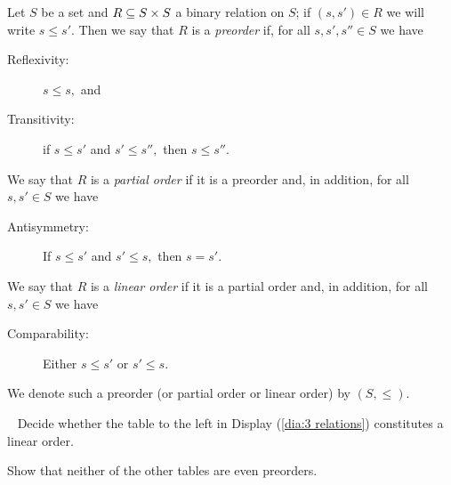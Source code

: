 \documentclass[../main/CT4S-EN-RU]{subfiles}
\begin{document}
\begin{definitionENG}\label{def:orders}
Let $S$ be a set and $R\ss S\times S$ a binary relation on $S$; if $(s,s')\in R$ we will write $s\leq s'.$ Then we say that $R$ is a {\em preorder} if, for all $s,s',s''\in S$ we have
\begin{description}
\item[Reflexivity:] $s\leq s,$ and
\item[Transitivity:] if $s\leq s'$ and $s'\leq s'',$ then $s\leq s''.$
\end{description}
We say that $R$ is a {\em partial order} if it is a preorder and, in addition, for all $s,s'\in S$ we have
\begin{description}
\item[Antisymmetry:] If $s\leq s'$ and $s'\leq s,$ then $s=s'.$
\end{description}
We say that $R$ is a {\em linear order} if it is a partial order and, in addition, for all $s,s'\in S$ we have
\begin{description}
\item[Comparability:] Either $s\leq s'$ or $s'\leq s.$
\end{description}
We denote such a preorder (or partial order or linear order) by $(S,\leq).$
\end{definitionENG}

\begin{definitionRUS}\label{def:orders}
\end{definitionRUS}

\begin{exerciseENG}~
\sexc Decide whether the table to the left in Display (\ref{dia:3 relations}) constitutes a linear order. 
\item Show that neither of the other tables are even preorders.
\endsexc
\end{exerciseENG}

\begin{exerciseRUS}~
\end{exerciseRUS}
\end{document}
